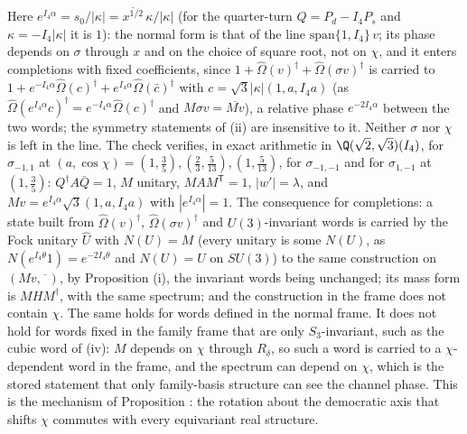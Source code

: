 Here $e^{I_4\alpha} = s_{0}/|\kappa| = \overline{x^{1/2}}\,\kappa/|\kappa|$ (for the quarter-turn $Q = P_{d} - I_4 P_{s}$ and $\kappa = -I_4|\kappa|$ it is $1$): the normal form is that of the line $\mathrm{span}\{1, I_4\}\,v$; its phase depends on $\sigma$ through $x$ and on the choice of square root, not on $\chi$, and it enters completions with fixed coefficients, since $1 + \hat\Omega(v)^{\dagger} + \hat\Omega(\sigma v)^{\dagger}$ is carried to $1 + e^{-I_4\alpha}\hat\Omega(c)^{\dagger} + e^{I_4\alpha}\hat\Omega(\bar{c})^{\dagger}$ with $c = \sqrt3|\kappa|(1, a, I_4 a)$ (as $\hat\Omega(e^{I_4\alpha}c)^{\dagger} = e^{-I_4\alpha}\hat\Omega(c)^{\dagger}$ and $M\sigma v = \overline{Mv}$), a relative phase $e^{-2I_4\alpha}$ between the two words; the symmetry statements of (ii) are insensitive to it. Neither $\sigma$ nor $\chi$ is left in the line. The check verifies, in exact arithmetic in $\Q(\sqrt2,\sqrt3)(I_4)$, for $\sigma_{-1,1}$ at $(a, \cos\chi) = (1, \tfrac35), (\tfrac23, \tfrac5{13}), (1, \tfrac5{13})$, for $\sigma_{-1,-1}$ and for $\sigma_{1,-1}$ at $(1, \tfrac35)$: $Q^{\dagger}A\bar{Q} = 1$, $M$ unitary, $MAM^{\mathsf T} = 1$, $|w'| = \lambda$, and $Mv = e^{I_4\alpha}\sqrt3(1, a, I_4 a)$ with $|e^{I_4\alpha}| = 1$. The consequence for completions: a state built from $\hat\Omega(v)^{\dagger}$, $\hat\Omega(\sigma v)^{\dagger}$ and $U(3)$-invariant words is carried by the Fock unitary $\hat{U}$ with $N(U) = M$ (every unitary is some $N(U)$, as $N(e^{I_4\theta}1) = e^{-2I_4\theta}$ and $N(U) = U$ on $SU(3)$) to the same construction on $(Mv, \overline{\phantom{v}})$, by Proposition (i), the invariant words being unchanged; its mass form is $MHM^{\dagger}$, with the same spectrum; and the construction in the frame does not contain $\chi$. The same holds for words defined in the normal frame. It does not hold for words fixed in the family frame that are only $S_{3}$-invariant, such as the cubic word of (iv): $M$ depends on $\chi$ through $R_{\delta}$, so such a word is carried to a $\chi$-dependent word in the frame, and the spectrum can depend on $\chi$, which is the stored statement that only family-basis structure can see the channel phase. This is the mechanism of Proposition : the rotation about the democratic axis that shifts $\chi$ commutes with every equivariant real structure.

